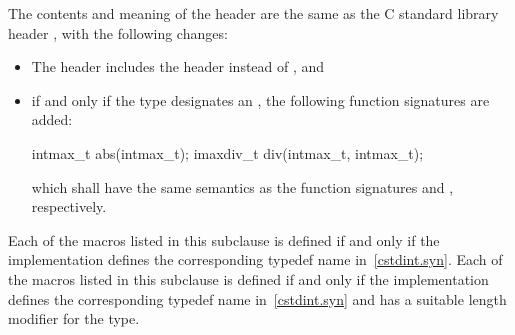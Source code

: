 \pnum
The contents and meaning of the header 
are the same as the C standard library header ,
with the following changes:
\begin{itemize}
\item
The header  includes the header  instead
of , and
\item
if and only if the type  designates an
, the following function signatures are added:
\begin{codeblock}
intmax_t abs(intmax_t);
imaxdiv_t div(intmax_t, intmax_t);
\end{codeblock}
which shall have the same semantics as the function signatures
 and
, respectively.
\end{itemize}


\pnum
Each of the  macros listed in this subclause
is defined if and only if the implementation
defines the corresponding typedef name in~\ref{cstdint.syn}.
Each of the  macros listed in this subclause
is defined if and only if the implementation
defines the corresponding typedef name in~\ref{cstdint.syn} and
has a suitable  length modifier for the type.

